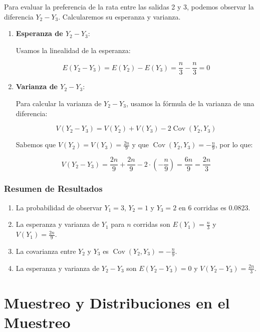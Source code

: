 \documentclass[
]{article}
\providecommand{\tightlist}{%
  \setlength{\itemsep}{0pt}\setlength{\parskip}{0pt}}
\begin{document}
Para evaluar la preferencia de la rata entre las salidas 2 y 3, podemos observar la diferencia \(Y_2 - Y_3\). Calcularemos su esperanza y varianza.

\begin{enumerate}
\def\labelenumi{\arabic{enumi}.}
\item
  \textbf{Esperanza de \(Y_2 - Y_3\)}:

  Usamos la linealidad de la esperanza:

  \[
  E(Y_2 - Y_3) = E(Y_2) - E(Y_3) = \frac{n}{3} - \frac{n}{3} = 0
  \]
\item
  \textbf{Varianza de \(Y_2 - Y_3\)}:

  Para calcular la varianza de \(Y_2 - Y_3\), usamos la fórmula de la varianza de una diferencia:

  \[
  V(Y_2 - Y_3) = V(Y_2) + V(Y_3) - 2 \operatorname{Cov}(Y_2, Y_3)
  \]

  Sabemos que \(V(Y_2) = V(Y_3) = \frac{2n}{9}\) y que \(\operatorname{Cov}(Y_2, Y_3) = -\frac{n}{9}\), por lo que:

  \[
  V(Y_2 - Y_3) = \frac{2n}{9} + \frac{2n}{9} - 2 \cdot \left(-\frac{n}{9}\right) = \frac{6n}{9} = \frac{2n}{3}
  \]
\end{enumerate}

\subsubsection{Resumen de Resultados}\label{resumen-de-resultados-2}

\begin{enumerate}
\def\labelenumi{\arabic{enumi}.}
\tightlist
\item
  La probabilidad de observar \(Y_1 = 3\), \(Y_2 = 1\) y \(Y_3 = 2\) en 6 corridas es 0.0823.
\item
  La esperanza y varianza de \(Y_1\) para \(n\) corridas son \(E(Y_1) = \frac{n}{3}\) y \(V(Y_1) = \frac{2n}{9}\).
\item
  La covarianza entre \(Y_2\) y \(Y_3\) es \(\operatorname{Cov}(Y_2, Y_3) = -\frac{n}{9}\).
\item
  La esperanza y varianza de \(Y_2 - Y_3\) son \(E(Y_2 - Y_3) = 0\) y \(V(Y_2 - Y_3) = \frac{2n}{3}\).
\end{enumerate}

\section{Muestreo y Distribuciones en el Muestreo}\label{muestreo-y-distribuciones-en-el-muestreo}
\end{document}
